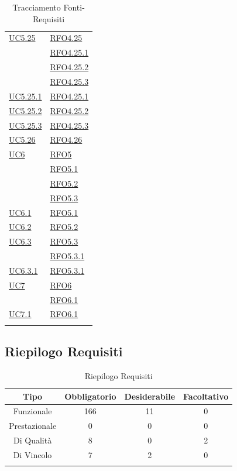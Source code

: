 \begin{longtable}{|>{\centering}m{5cm}|m{5cm}<{\centering}|}
\hyperref[UC5.25]{UC5.25} & \hyperlink{RFO4.25}{RFO4.25}\\
& \hyperlink{RFO4.25.1}{RFO4.25.1}\\
& \hyperlink{RFO4.25.2}{RFO4.25.2}\\
& \hyperlink{RFO4.25.3}{RFO4.25.3}\\ \hline
\hyperref[UC5.25.1]{UC5.25.1} & \hyperlink{RFO4.25.1}{RFO4.25.1}\\\hline
\hyperref[UC5.25.2]{UC5.25.2} & \hyperlink{RFO4.25.2}{RFO4.25.2}\\\hline
\hyperref[UC5.25.3]{UC5.25.3} & \hyperlink{RFO4.25.3}{RFO4.25.3}\\\hline
\hyperref[UC5.26]{UC5.26} & \hyperlink{RFO4.26}{RFO4.26}\\\hline

\hyperref[UC6]{UC6} & \hyperlink{RFO5}{RFO5}\\
 & \hyperlink{RFO5.1}{RFO5.1}\\
 & \hyperlink{RFO5.2}{RFO5.2}\\
 & \hyperlink{RFO5.3}{RFO5.3}\\ \hline
 \hyperref[UC6.1]{UC6.1} & \hyperlink{RFO5.1}{RFO5.1}\\ \hline
 \hyperref[UC6.2]{UC6.2} & \hyperlink{RFO5.2}{RFO5.2}\\ \hline
 \hyperref[UC6.3]{UC6.3} & \hyperlink{RFO5.3}{RFO5.3}\\
 & \hyperlink{RFO5.3.1}{RFO5.3.1}\\ \hline
  \hyperref[UC6.3.1]{UC6.3.1} & \hyperlink{RFO5.3.1}{RFO5.3.1}\\ \hline
\hyperref[UC7]{UC7} & \hyperlink{RFO6}{RFO6}\\
& \hyperlink{RFO6.1}{RFO6.1}\\ \hline
\hyperref[UC7.1]{UC7.1} & \hyperlink{RFO6.1}{RFO6.1}\\ \hline

\caption[Tracciamento Fonti-Requisiti]{Tracciamento Fonti-Requisiti}
\label{tabella:fonti-requi}
\end{longtable}
\clearpage

\subsection{Riepilogo Requisiti}
\normalsize
\begin{longtable}{|c|c|c|c|}
\hline
\textbf{Tipo} & \textbf{Obbligatorio} & \textbf{Desiderabile} & \textbf{Facoltativo}\\
\hline
Funzionale & 166 & 11 & 0\\ \hline
Prestazionale & 0 & 0 & 0\\ \hline
Di Qualità & 8 & 0 & 2\\ \hline
Di Vincolo & 7 & 2 & 0\\ \hline
\caption[Riepilogo Requisiti]{Riepilogo Requisiti}
\label{tabella:riepilogorequi}
\end{longtable}
\clearpage





